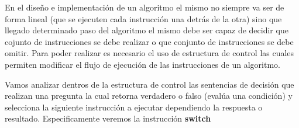 En el diseño e implementación de un algoritmo el mismo no siempre va ser de forma lineal (que se ejecuten cada instrucción una detrás de la otra) sino que llegado determinado paso del algoritmo el mismo debe ser capaz de decidir que cojunto de instrucciones se debe realizar  o que conjunto de instrucciones se debe omitir. Para poder realizar es necesario el uso de estructura de control las cuales permiten modificar el flujo de ejecución de las instrucciones de un algoritmo.

Vamos analizar dentros de la estructura de control las sentencias de decisión que
realizan una pregunta la cual retorna verdadero o falso (evalúa una condición) y selecciona la
siguiente instrucción a ejecutar dependiendo la respuesta o resultado. Especificamente veremos la instrucción \textbf{switch}